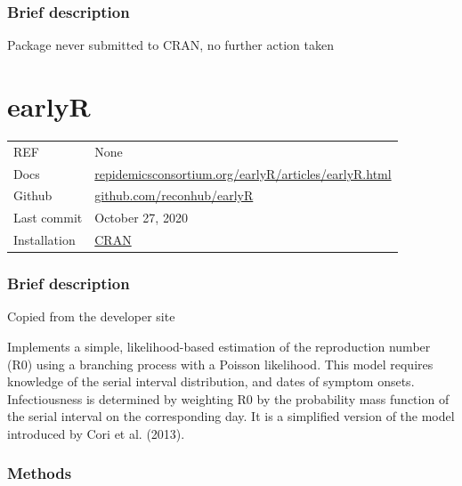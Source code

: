 \documentclass[
  letterpaper,
  DIV=11,
  numbers=noendperiod]{scrreprt}
\begin{document}
\subsection*{Brief description}\label{brief-description}

Package never submitted to CRAN, no further action taken

\chapter*{earlyR}\label{earlyr}


\begin{longtable}[]{@{}
  >{\raggedright\arraybackslash}p{}
  >{\raggedright\arraybackslash}p{}@{}}
\toprule\noalign{}
\endhead
\bottomrule\noalign{}
\endlastfoot
REF & None \\
Docs &
\href{https://www.repidemicsconsortium.org/earlyR/articles/earlyR.html}{repidemicsconsortium.org/earlyR/articles/earlyR.html} \\
Github &
\href{https://github.com/reconhub/earlyR}{github.com/reconhub/earlyR} \\
Last commit & October 27, 2020 \\
Installation &
\href{https://cran.r-project.org/web/packages/earlyR/index.html}{CRAN} \\
\end{longtable}

\subsection*{Brief description}\label{brief-description-1}

Copied from the developer site

Implements a simple, likelihood-based estimation of the reproduction
number (R0) using a branching process with a Poisson likelihood. This
model requires knowledge of the serial interval distribution, and dates
of symptom onsets. Infectiousness is determined by weighting R0 by the
probability mass function of the serial interval on the corresponding
day. It is a simplified version of the model introduced by Cori et al.
(2013).

\subsection*{Methods}\label{methods-1}
\end{document}
